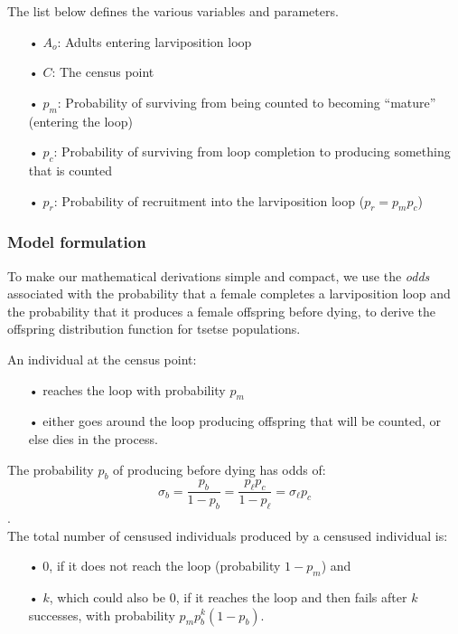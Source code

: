 \documentclass[smallextended]{svjour3}
\begin{document}
The list below defines the various variables and parameters.

\begin{itemize}
	\item[•] $A_{o}$: Adults entering larviposition loop
	\item[•] $C$: The census point
	\item[•]$p_m$: Probability of surviving from being counted to becoming “mature” (entering the loop)
	\item[•]$p_c$: Probability of surviving from loop completion to producing something that is counted
	\item[•]$p_r$: Probability of recruitment into the larviposition loop ($p_r = p_mp_c$)
\end{itemize}

\subsubsection{Model formulation}
To make our mathematical derivations simple and compact, we use the \textit{odds} associated with the probability that a female completes a larviposition loop and the probability  that it produces a female offspring before dying, to derive the offspring distribution function for tsetse populations.  

An individual at the census point: 

\begin{itemize}
	\item [•] reaches the loop with probability $p_m$
	\item [•] either goes around the loop producing offspring that will be counted, or else dies in the process.
\end{itemize}

The probability $p_b$ of producing before dying  has odds of: 
$$\sigma_b = \frac{p_b}{1-p_b} = \frac{p_\ell p_c}{1-p_\ell} = \sigma_\ell p_c$$.\\

The total number of censused individuals produced by a censused individual is: 

\begin{itemize}
	\item [•] 0, if it does not reach the loop (probability $1-p_m$) and
	\item [•] $k$, which could also be 0, if it reaches the loop and then fails after $k$ successes, with probability $p_m p_b^k (1-p_b)$.\\
\end{itemize}  
\end{document}
